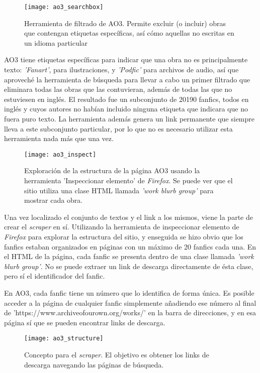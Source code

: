\documentclass{pre-tfg}
\begin{document}
\begin{SCfigure}
	\caption{Herramienta de filtrado de AO3. Permite excluir (o incluir) obras que contengan etiquetas específicas, así cómo aquellas no escritas en un idioma particular}
	\label{fig:ao3_search}
	\texttt{[image: ao3\_searchbox]}
	\centering
\end{SCfigure}

AO3 tiene etiquetas específicas para indicar que una obra no es principalmente texto: \textit{'Fanart'}, para ilustraciones, y \textit{'Podfic'} para archivos de audio, así que aproveché la herramienta de búsqueda para llevar a cabo un primer filtrado que eliminara todas las obras que las contuvieran, además de todas las que no estuviesen en inglés. El resultado fue un subconjunto de 20190 fanfics, todos en inglés y cuyos autores no habían incluido ninguna etiqueta que indicara que no fuera puro texto. La herramienta además genera un link permanente que siempre lleva a este subconjunto particular, por lo que no es necesario utilizar esta herramienta nada más que una vez.

\begin{figure}
	\texttt{[image: ao3\_inspect]}
	\caption{Exploración de la estructura de la página AO3 usando la herramienta 'Inspeccionar elemento' de \textit{Firefox}. Se puede ver que el sitio utiliza una clase HTML llamada \textit{'work blurb group'} para mostrar cada obra.}
	\label{fig:ao3_inspect}
	\centering
\end{figure} 

Una vez localizado el conjunto de textos y el link a los mismos, viene la parte de crear el \textit{scraper} en sí. Utilizando la herramienta de inspeccionar elemento de \textit{Firefox} para explorar la estructura del sitio, y enseguida se hizo obvio que los fanfics estaban organizados en páginas con un máximo de 20 fanfics cada una. En el HTML de la página, cada fanfic se presenta dentro de una clase llamada \textit{'work blurb group'}. No se puede extraer un link de descarga directamente de ésta clase, pero sí el identificador del fanfic.

En AO3, cada fanfic tiene un número que lo identifica de forma única. Es posible acceder a la página de cualquier fanfic simplemente añadiendo ese número al final de \newline 'https://www.archiveofourown.org/works/' en la barra de direcciones, y en esa página sí que se pueden encontrar links de descarga.

\begin{figure}[h]
	\texttt{[image: ao3\_structure]}
	\caption{Concepto para el \textit{scraper}. El objetivo es obtener los links de descarga navegando las páginas de búsqueda.}
	\label{fig:ao3_structure}
	\centering
\end{figure}
\end{document}
